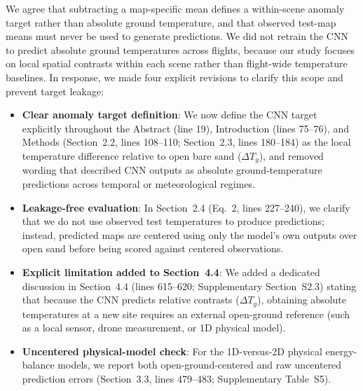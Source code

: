 \documentclass[12pt,english]{reviewresponse}
\begin{document}
\begin{revresponse}
We agree that subtracting a map-specific mean defines a within-scene anomaly target rather than absolute ground temperature, and that observed test-map means must never be used to generate predictions. We did not retrain the CNN to predict absolute ground temperatures across flights, because our study focuses on local spatial contrasts within each scene rather than flight-wide temperature baselines. In response, we made four explicit revisions to clarify this scope and prevent target leakage:
\begin{itemize}[leftmargin=*, itemsep=0.2em]
    \item \textbf{Clear anomaly target definition}: We now define the CNN target explicitly throughout the Abstract (line 19), Introduction (lines 75--76), and Methods (Section~2.2, lines 108--110; Section~2.3, lines 180--184) as the local temperature difference relative to open bare sand ($\Delta T_g$), and removed wording that described CNN outputs as absolute ground-temperature predictions across temporal or meteorological regimes.
    \item \textbf{Leakage-free evaluation}: In Section~2.4 (Eq.~2, lines 227--240), we clarify that we do not use observed test temperatures to produce predictions; instead, predicted maps are centered using only the model's own outputs over open sand before being scored against centered observations.
    \item \textbf{Explicit limitation added to Section~4.4}: We added a dedicated discussion in Section~4.4 (lines 615--620; Supplementary Section~S2.3) stating that because the CNN predicts relative contrasts ($\Delta T_g$), obtaining absolute temperatures at a new site requires an external open-ground reference (such as a local sensor, drone measurement, or 1D physical model).
    \item \textbf{Uncentered physical-model check}: For the 1D-versus-2D physical energy-balance models, we report both open-ground-centered and raw uncentered prediction errors (Section~3.3, lines 479--483; Supplementary Table~S5).
\end{itemize}
\end{revresponse}
\end{document}
